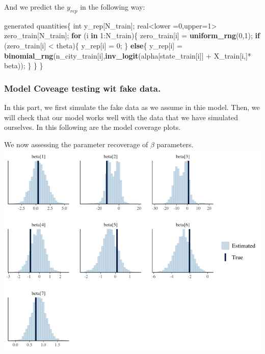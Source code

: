 \documentclass[]{tufte-handout}
\newenvironment{Shaded}{}{}
\newcommand{\ControlFlowTok}[1]{\textcolor[rgb]{0.00,0.44,0.13}{\textbf{#1}}}
\newcommand{\DecValTok}[1]{\textcolor[rgb]{0.25,0.63,0.44}{#1}}
\newcommand{\KeywordTok}[1]{\textcolor[rgb]{0.00,0.44,0.13}{\textbf{#1}}}
\newcommand{\NormalTok}[1]{#1}
\newcommand{\OperatorTok}[1]{\textcolor[rgb]{0.40,0.40,0.40}{#1}}
\newcommand{\StringTok}[1]{\textcolor[rgb]{0.25,0.44,0.63}{#1}}
\begin{document}
And we predict the \(y_{rep}\) in the following way:

\begin{Shaded}
\begin{Highlighting}[]
\NormalTok{generated quantities\{}
\NormalTok{  int y_rep[N_train];}
\NormalTok{  real}\OperatorTok{<}\NormalTok{lower =}\DecValTok{0}\NormalTok{,upper=}\DecValTok{1}\OperatorTok{>}\StringTok{ }\NormalTok{zero_train[N_train];}
  \ControlFlowTok{for}\NormalTok{ (i }\ControlFlowTok{in} \DecValTok{1}\OperatorTok{:}\NormalTok{N_train)\{}
\NormalTok{    zero_train[i] =}\StringTok{ }\KeywordTok{uniform_rng}\NormalTok{(}\DecValTok{0}\NormalTok{,}\DecValTok{1}\NormalTok{);}
    \ControlFlowTok{if}\NormalTok{ (zero_train[i] }\OperatorTok{<}\StringTok{ }\NormalTok{theta)\{}
\NormalTok{      y_rep[i] =}\StringTok{ }\DecValTok{0}\NormalTok{;}
\NormalTok{      \}}
    \ControlFlowTok{else}\NormalTok{\{}
\NormalTok{      y_rep[i] =}\StringTok{ }\KeywordTok{binomial_rng}\NormalTok{(n_city_train[i],}\KeywordTok{inv_logit}\NormalTok{(alpha[state_train[i]] }\OperatorTok{+}\StringTok{ }\NormalTok{X_train[i,]}\OperatorTok{*}\StringTok{ }\NormalTok{beta));}
\NormalTok{      \}}
\NormalTok{  \}}
\NormalTok{\}}
\end{Highlighting}
\end{Shaded}

\hypertarget{model-coveage-testing-wit-fake-data.}{%
\subsubsection{Model Coveage testing wit fake
data.}\label{model-coveage-testing-wit-fake-data.}}

In this part, we first simulate the fake data as we assume in thie
model. Then, we will check that our model works well with the data that
we have simulated ourselves. In this following are the model coverage
plots.

We now assessing the parameter recoverage of \(\beta\) parameters.
\includegraphics{./pic/Rplot01.png}
\end{document}
